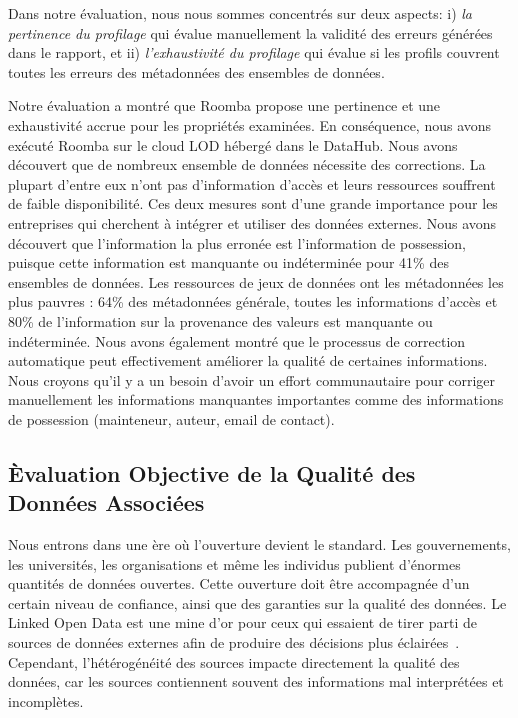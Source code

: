 Dans notre \'{e}valuation, nous nous sommes concentr\'{e}s sur deux aspects: i) \textit{la pertinence du profilage} qui \'{e}value manuellement la validit\'{e} des erreurs g\'{e}n\'{e}r\'{e}es dans le rapport, et ii) \textit{l'exhaustivit\'{e} du profilage} qui \'{e}value si les profils couvrent toutes les erreurs des m\'{e}tadonn\'{e}es des ensembles de donn\'{e}es.

Notre \'{e}valuation a montr\'{e} que Roomba propose une pertinence et une exhaustivit\'{e} accrue pour les propri\'{e}t\'{e}s examin\'{e}es. En cons\'{e}quence, nous avons ex\'{e}cut\'{e} Roomba sur le cloud LOD h\'{e}berg\'{e} dans le DataHub. Nous avons d\'{e}couvert que de nombreux ensemble de donn\'{e}es n\'{e}cessite des corrections. La plupart d'entre eux n'ont pas d'information d'acc\`{e}s et leurs ressources souffrent de faible disponibilit\'{e}. Ces deux mesures sont d'une grande importance pour les entreprises qui cherchent \`{a} int\'{e}grer et utiliser des donn\'{e}es externes. Nous avons d\'{e}couvert que l'information la plus erron\'{e}e est l'information de possession, puisque cette information est manquante ou ind\'{e}termin\'{e}e pour 41\% des ensembles de donn\'{e}es. Les ressources de jeux de donn\'{e}es ont les m\'{e}tadonn\'{e}es les plus pauvres : 64\% des m\'{e}tadonn\'{e}es g\'{e}n\'{e}rale, toutes les informations d'acc\`{e}s et 80\% de l'information sur la provenance des valeurs est manquante ou ind\'{e}termin\'{e}e. Nous avons \'{e}galement montr\'{e} que le processus de correction automatique peut effectivement am\'{e}liorer la qualit\'{e} de certaines informations. Nous croyons qu'il y a un besoin d'avoir un effort communautaire pour corriger manuellement les informations manquantes importantes comme des informations de possession (mainteneur, auteur, email de contact).

\subsection{\`{E}valuation Objective de la Qualit\'{e} des Donn\'{e}es Associ\'{e}es}

Nous entrons dans une \`{e}re o\`{u} l'ouverture devient le standard. Les gouvernements, les universit\'{e}s, les organisations et m\^{e}me les individus publient d'\'{e}normes quantit\'{e}s de donn\'{e}es ouvertes. Cette ouverture doit \^{e}tre accompagn\'{e}e d'un certain niveau de confiance, ainsi que des garanties sur la qualit\'{e} des donn\'{e}es. Le Linked Open Data est une mine d'or pour ceux qui essaient de tirer parti de sources de donn\'{e}es externes afin de produire des d\'{e}cisions plus \'{e}clair\'{e}es~\cite{Boyd:Article:11}. Cependant, l'h\'{e}t\'{e}rog\'{e}n\'{e}it\'{e} des sources impacte directement la qualit\'{e} des donn\'{e}es, car les sources contiennent souvent des informations mal interpr\'{e}t\'{e}es et incompl\`{e}tes.

